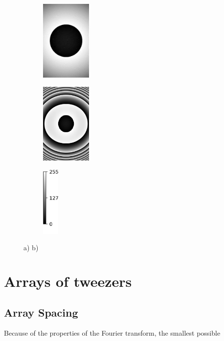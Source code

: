 \begin{figure}
\begin{subfigure}{.18\linewidth}
		\centering
		\includegraphics[height=4cm]{figures/SLMphase/flatness.jpg}
		\caption{}
		\label{fig:Flatness}
	\end{subfigure}
	\begin{subfigure}{.18\linewidth}
		\centering
		\includegraphics[height=4cm]{figures/SLMphase/zernike.jpg}
		\caption{}
		\label{fig:Zernike}
	\end{subfigure}
	\begin{subfigure}{0.055\linewidth}
	    \centering
	    \includegraphics[height = 3.5cm]{figures/SLMphase/colorbar.jpg}
	\end{subfigure}
	\caption{a) b)}
	\label{fig:SLMphase}
\end{figure}



\section{Arrays of tweezers}

\subsection{Array Spacing}

Because of the properties of the Fourier transform, the smallest possible 

